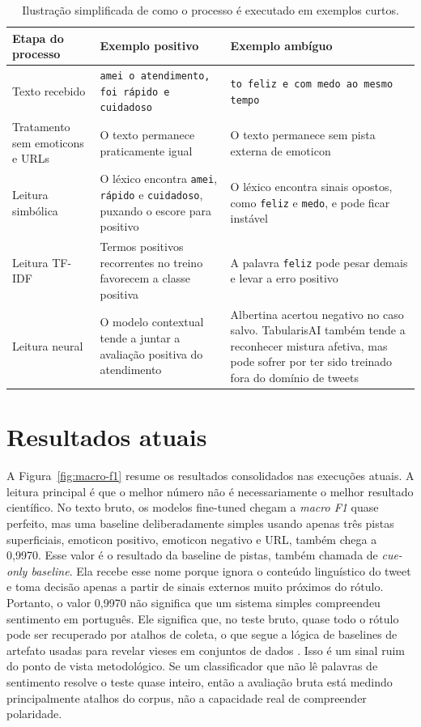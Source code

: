 \documentclass[11pt,a4paper]{article}
\newcommand{\altrowcolors}{\rowcolors{2}{black!4}{white}}
\newcommand{\clearrowcolors}{\rowcolors{2}{}{}}
\begin{document}
\begin{table}[h]
\small
\centering
\renewcommand{\arraystretch}{1.16}
\altrowcolors
\begin{tabularx}{\linewidth}{@{}L{2.6cm}Y Y@{}}
\toprule
\textbf{Etapa do processo} & \textbf{Exemplo positivo} & \textbf{Exemplo ambíguo} \\
\midrule
Texto recebido & \texttt{amei o atendimento, foi rápido e cuidadoso} & \texttt{to feliz e com medo ao mesmo tempo} \\
\addlinespace[0.3em]
Tratamento sem emoticons e URLs & O texto permanece praticamente igual & O texto permanece sem pista externa de emoticon \\
\addlinespace[0.3em]
Leitura simbólica & O léxico encontra \texttt{amei}, \texttt{rápido} e \texttt{cuidadoso}, puxando o escore para positivo & O léxico encontra sinais opostos, como \texttt{feliz} e \texttt{medo}, e pode ficar instável \\
\addlinespace[0.3em]
Leitura TF-IDF & Termos positivos recorrentes no treino favorecem a classe positiva & A palavra \texttt{feliz} pode pesar demais e levar a erro positivo \\
\addlinespace[0.3em]
Leitura neural & O modelo contextual tende a juntar a avaliação positiva do atendimento & Albertina acertou negativo no caso salvo. TabularisAI também tende a reconhecer mistura afetiva, mas pode sofrer por ter sido treinado fora do domínio de tweets \\
\bottomrule
\end{tabularx}
\clearrowcolors
\caption{Ilustração simplificada de como o processo é executado em exemplos curtos.}
\label{tab:execucao-exemplo}
\end{table}

\section{Resultados atuais}

A Figura~\ref{fig:macro-f1} resume os resultados consolidados nas execuções atuais. A leitura principal é que o melhor número não é necessariamente o melhor resultado científico. No texto bruto, os modelos fine-tuned chegam a \emph{macro F1} quase perfeito, mas uma baseline deliberadamente simples usando apenas três pistas superficiais, emoticon positivo, emoticon negativo e URL, também chega a 0,9970. Esse valor é o resultado da baseline de pistas, também chamada de \emph{cue-only baseline}. Ela recebe esse nome porque ignora o conteúdo linguístico do tweet e toma decisão apenas a partir de sinais externos muito próximos do rótulo. Portanto, o valor 0,9970 não significa que um sistema simples compreendeu sentimento em português. Ele significa que, no teste bruto, quase todo o rótulo pode ser recuperado por atalhos de coleta, o que segue a lógica de baselines de artefato usadas para revelar vieses em conjuntos de dados \citep{gururangan2018artifacts,poliak2018hypothesis}. Isso é um sinal ruim do ponto de vista metodológico. Se um classificador que não lê palavras de sentimento resolve o teste quase inteiro, então a avaliação bruta está medindo principalmente atalhos do corpus, não a capacidade real de compreender polaridade.
\end{document}
